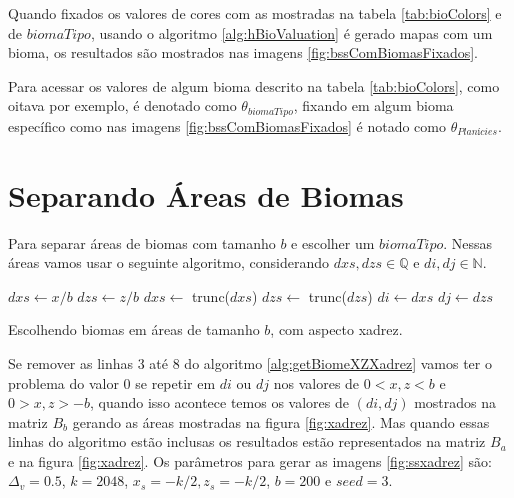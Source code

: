 Quando fixados os valores de cores com as mostradas
na tabela \ref{tab:bioColors} e de $biomaTipo$, usando o
algoritmo \ref{alg:hBioValuation} é gerado mapas com um bioma,
os resultados são mostrados nas imagens \ref{fig:bssComBiomasFixados}.

Para acessar os valores de algum bioma descrito na tabela \ref{tab:bioColors}, como oitava por exemplo,
é denotado como $\theta_{biomaTipo}$, fixando em algum bioma específico como nas imagens \ref{fig:bssComBiomasFixados}
é notado como $\theta_{Planícies}$.

\section{Separando Áreas de Biomas}
Para separar áreas de biomas com tamanho $b$ e escolher um $biomaTipo$. Nessas áreas
vamos usar o seguinte algoritmo, considerando $dxs, dzs \in \mathbb{Q}$ e $di, dj \in \mathbb{N}$.

\begin{algorithm}[H]\label{alg:getBiomeXZXadrez}
    $dxs \leftarrow x/b$\;
    $dzs \leftarrow z/b$\;
    $dxs \leftarrow$ trunc($dxs$)\;
    $dzs \leftarrow$ trunc($dzs$)\;
    $di \leftarrow dxs$\;
    $dj \leftarrow dzs$\;
    
    
    \caption{Escolhendo biomas em áreas de tamanho $b$, com aspecto xadrez.}
\end{algorithm}

Se remover as linhas 3 até 8 do algoritmo \ref{alg:getBiomeXZXadrez} vamos ter o 
problema do valor $0$ se repetir em $di$ ou $dj$ nos valores de $0 < x, z < b$ e $0 > x, z > -b$, 
quando isso acontece temos os valores de $(di, dj)$ mostrados na
matriz $B_{b}$ gerando as áreas mostradas na figura \ref{fig:xadrez}. Mas quando essas
linhas do algoritmo estão inclusas os resultados estão representados na matriz $B_{a}$
e na figura \ref{fig:xadrez}. Os parâmetros para gerar as
imagens \ref{fig:ssxadrez} são: $\Delta_{v} = 0.5$, 
$k = 2048$, $ x_{s} = -k/2 , z_{s} = -k/2$, $b = 200$ e $seed = 3$.


